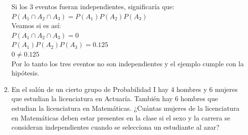 \documentclass[12pt,a4paper]{report}
\begin{document}
\begin{enumerate}
{  Si los 3 eventos fueran independientes, significaría que: \\$P(A_{1} \cap A_{2} \cap A_{3}) = P(A_{1})P(A_{2})P(A_{3})$\\
  Veamos si es así:\\
  $P(A_{1} \cap A_{2} \cap A_{3}) = 0$\\
  $P(A_{1})P(A_{2})P(A_{3}) = 0.125$\\
  $ 0  \neq 0.125$ \\
  Por lo tanto los tres eventos no son independientes y el ejemplo cumple con la hipótesis.\\
	}

   \item {En el salón de un cierto grupo de Probabilidad I hay 4 hombres y 6 mujeres que estudian la licenciatura en Actuaría. También hay 6 hombres que estudian la licenciatura en Matemáticas. ¿Cuántas mujeres de la licenciatura en Matemáticas deben estar presentes en la clase si el sexo y la carrera se consideran independientes cuando se selecciona un estudiante al azar?	\\

}
\end{enumerate}
\end{document}
